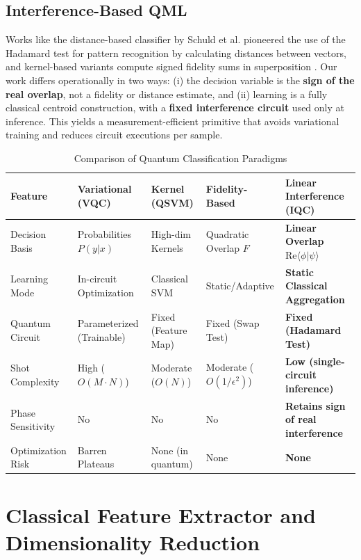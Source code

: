 \documentclass[conference]{IEEEtran}
\begin{document}
\subsection{Interference-Based QML}

Works like the distance-based classifier by Schuld et al. \cite{schuld2017distance,schuld2018book} pioneered the use of the Hadamard test for pattern recognition by calculating distances between vectors, and kernel-based variants compute signed fidelity sums in superposition \cite{blank2020kernel,blank2022compact}. Our work differs operationally in two ways: (i) the decision variable is the \textbf{sign of the real overlap}, not a fidelity or distance estimate, and (ii) learning is a fully classical centroid construction, with a \textbf{fixed interference circuit} used only at inference. This yields a measurement-efficient primitive that avoids variational training and reduces circuit executions per sample.

\begin{table}[t]
\centering
\caption{Comparison of Quantum Classification Paradigms}
\label{tab:comparison}
\begin{tabular}{@{}lllll@{}}
\toprule
Feature & Variational (VQC) & Kernel (QSVM) & Fidelity-Based & \textbf{Linear Interference (IQC)} \\ \midrule
Decision Basis & Probabilities $P(y|x)$ & High-dim Kernels & Quadratic Overlap $F$ & \textbf{Linear Overlap $\mathrm{Re}\langle \phi|\psi \rangle$} \\
Learning Mode & In-circuit Optimization & Classical SVM & Static/Adaptive & \textbf{Static Classical Aggregation} \\
Quantum Circuit & Parameterized (Trainable) & Fixed (Feature Map) & Fixed (Swap Test) & \textbf{Fixed (Hadamard Test)} \\
Shot Complexity & High ($O(M \cdot N)$) & Moderate ($O(N)$) & Moderate ($O(1/\epsilon^2)$) & \textbf{Low (single-circuit inference)} \\
Phase Sensitivity & No & No & No & \textbf{Retains sign of real interference} \\
Optimization Risk & Barren Plateaus & None (in quantum) & None & \textbf{None} \\ \bottomrule
\end{tabular}
\end{table}

\section{Classical Feature Extractor and Dimensionality Reduction}
\end{document}
